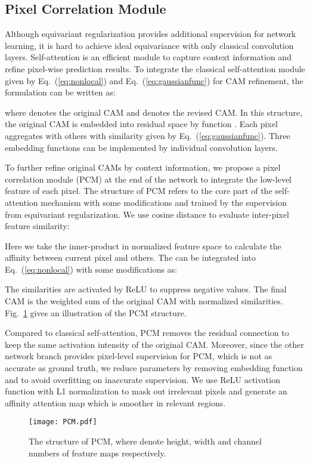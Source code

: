 \documentclass[10pt,twocolumn,letterpaper]{article}
\begin{document}
	\subsection{Pixel Correlation Module}
	\label{subsec:PCM}
	Although equivariant regularization provides additional supervision for network learning, it is hard to achieve ideal equivariance with only classical convolution layers. Self-attention is an efficient module to capture context information and refine pixel-wise prediction results. To integrate the classical self-attention module given by Eq.~(\ref{eq:nonlocal}) and Eq.~(\ref{eq:gaussianfunc}) for CAM refinement, the formulation can be written as:
	
	where  denotes the original CAM and  denotes the revised CAM. In this structure, the original CAM is embedded into residual space by function . Each pixel aggregates with others with similarity given by Eq.~(\ref{eq:gaussianfunc}). Three embedding functions  can be implemented by individual  convolution layers.
	
	To further refine original CAMs by context information, we propose a pixel correlation module (PCM) at the end of the network to integrate the low-level feature of each pixel. The structure of PCM refers to the core part of the self-attention mechanism with some modifications and trained by the supervision from equivariant regularization. We use cosine distance to evaluate inter-pixel feature similarity:
	
	Here we take the inner-product in normalized feature space to calculate the affinity between current pixel  and others. The  can be integrated into Eq.~(\ref{eq:nonlocal}) with some modifications as:
	
	The similarities are activated by ReLU to suppress negative values. The final CAM is the weighted sum of the original CAM with normalized similarities. Fig.~\ref{fig:PCM} gives an illustration of the PCM structure.
	
	Compared to classical self-attention, PCM removes the residual connection to keep the same activation intensity of the original CAM. Moreover, since the other network branch provides pixel-level supervision for PCM, which is not as accurate as ground truth, we reduce parameters by removing embedding function  and  to avoid overfitting on inaccurate supervision. We use ReLU activation function with L1 normalization to mask out irrelevant pixels and generate an affinity attention map which is smoother in relevant regions. 
	\begin{figure}[t]
		\centering
		\texttt{[image: PCM.pdf]}
		\caption{The structure of PCM, where  denote height, width and channel numbers of feature maps respectively.}
		\label{fig:PCM}
\end{figure}
	
\end{document}
